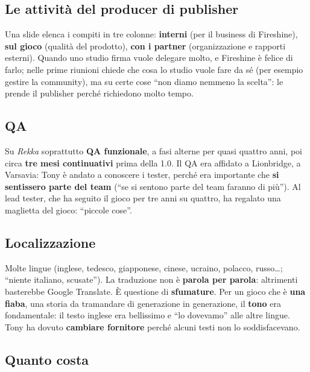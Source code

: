 \subsection{Le attività del producer di publisher}

Una slide elenca i compiti in tre colonne: \textbf{interni} (per il business di
Fireshine), \textbf{sul gioco} (qualità del prodotto), \textbf{con i partner}
(organizzazione e rapporti esterni). Quando uno studio firma vuole delegare molto,
e Fireshine è felice di farlo; nelle prime riunioni chiede che cosa lo studio vuole
fare da sé (per esempio gestire la community), ma su certe cose ``non diamo nemmeno
la scelta'': le prende il publisher perché richiedono molto tempo.

\subsection{QA}

Su \emph{Rekka} soprattutto \textbf{QA funzionale}, a fasi alterne per quasi
quattro anni, poi circa \textbf{tre mesi continuativi} prima della 1.0. Il QA era
affidato a Lionbridge, a Varsavia: Tony è andato a conoscere i tester, perché era
importante che \textbf{si sentissero parte del team} (``se si sentono parte del
team faranno di più''). Al lead tester, che ha seguito il gioco per tre anni su
quattro, ha regalato una maglietta del gioco: ``piccole cose''.

\subsection{Localizzazione}

Molte lingue (inglese, tedesco, giapponese, cinese, ucraino, polacco, russo\dots;
``niente italiano, scusate''). La traduzione non è \textbf{parola per parola}:
altrimenti basterebbe Google Translate. È questione di \textbf{sfumature}. Per un
gioco che è \textbf{una fiaba}, una storia da tramandare di generazione in
generazione, il \textbf{tono} era fondamentale: il testo inglese era bellissimo e
``lo dovevamo'' alle altre lingue. Tony ha dovuto \textbf{cambiare fornitore}
perché alcuni testi non lo soddisfacevano.

\subsection{Quanto costa}

